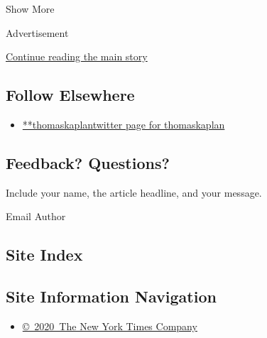 Show More

Advertisement

\protect\hyperlink{after-mid2}{Continue reading the main story}

\hypertarget{follow-elsewhere}{%
\subsection{Follow Elsewhere}\label{follow-elsewhere}}

\begin{itemize}
\tightlist
\item
  \href{https://twitter.com/thomaskaplan}{**thomaskaplantwitter page for
  thomaskaplan}
\end{itemize}

\hypertarget{feedback-questions}{%
\subsection{Feedback? Questions?}\label{feedback-questions}}

Include your name, the article headline, and your message.

Email Author

\hypertarget{site-index}{%
\subsection{Site Index}\label{site-index}}

\hypertarget{site-information-navigation}{%
\subsection{Site Information
Navigation}\label{site-information-navigation}}

\begin{itemize}
\tightlist
\item
  \href{https://help.nytimes3xbfgragh.onion/hc/en-us/articles/115014792127-Copyright-notice}{©~2020~The
  New York Times Company}
\end{itemize}

